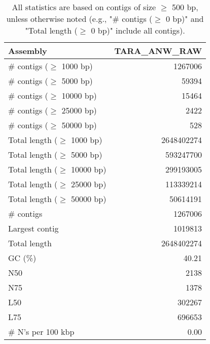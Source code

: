 \documentclass[12pt,a4paper]{article}
\begin{document}
\begin{table}[ht]
\begin{center}
\caption{All statistics are based on contigs of size $\geq$ 500 bp, unless otherwise noted (e.g., "\# contigs ($\geq$ 0 bp)" and "Total length ($\geq$ 0 bp)" include all contigs).}
\begin{tabular}{|l*{1}{|r}|}
\hline
Assembly & TARA\_ANW\_RAW \\ \hline
\# contigs ($\geq$ 1000 bp) & 1267006 \\ \hline
\# contigs ($\geq$ 5000 bp) & 59394 \\ \hline
\# contigs ($\geq$ 10000 bp) & 15464 \\ \hline
\# contigs ($\geq$ 25000 bp) & 2422 \\ \hline
\# contigs ($\geq$ 50000 bp) & 528 \\ \hline
Total length ($\geq$ 1000 bp) & 2648402274 \\ \hline
Total length ($\geq$ 5000 bp) & 593247700 \\ \hline
Total length ($\geq$ 10000 bp) & 299193005 \\ \hline
Total length ($\geq$ 25000 bp) & 113339214 \\ \hline
Total length ($\geq$ 50000 bp) & 50614191 \\ \hline
\# contigs & 1267006 \\ \hline
Largest contig & 1019813 \\ \hline
Total length & 2648402274 \\ \hline
GC (\%) & 40.21 \\ \hline
N50 & 2138 \\ \hline
N75 & 1378 \\ \hline
L50 & 302267 \\ \hline
L75 & 696653 \\ \hline
\# N's per 100 kbp & 0.00 \\ \hline
\end{tabular}
\end{center}
\end{table}
\end{document}
